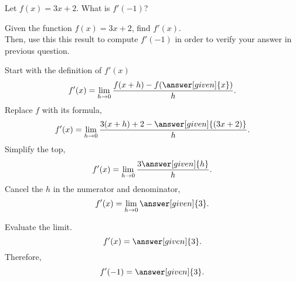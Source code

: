 \documentclass{ximera}
\begin{document}
\begin{question}
  Let $f(x) = 3x+2$. What is $f'(-1)$?
  \begin{multipleChoice}
  \end{multipleChoice}
\end{question}
\begin{example}
	Given the function $f(x) = 3x+2$, find  $f'(x)$. \\
	Then, use this this result to compute $f'(-1)$ in order to verify your answer in previous question.
	\begin{explanation}
		Start with the definition of $f'(x)$
		\[
		f'(x) = \lim_{h\to0}\frac{f(x+h)-f(\answer[given]{x})}{h}.
		\] 
		Replace $f$ with its formula,
		\[
		f'(x) = \lim_{h\to0}\frac{3(x+h)+2-\answer[given]{(3x+2)}}{h}.
		\]
		Simplify the top,
		\[
		f'(x) = \lim_{h\to0}\frac{3\answer[given]{h}}{h}.
		\]
				Cancel the $h$ in the numerator and denominator,
		\[
		f'(x) = \lim_{h\to0}\answer[given]{3}.
		\]
		
		Evaluate the limit.
		\[
		f'(x) = \answer[given]{3}.
		\]
		Therefore,
		\[
		f'(-1) = \answer[given]{3}.
		\]
	\end{explanation}
\end{example}
\end{document}
